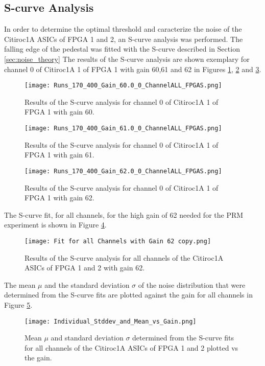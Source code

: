 \subsection{S-curve Analysis}
In order to determine the optimal threshold and caracterize the noise of the Citiroc1A ASICs of FPGA 1 and 2, an S-curve analysis was performed.
\newline
The falling edge of the pedestal was fitted with the S-curve described in Section \ref{sec:noise_theory}
\newline
The results of the S-curve analysis are shown exemplary for channel 0 of Citiroc1A 1 of FPGA 1 with gain 60,61 and 62 in Figures \ref{fig:S_curve_60}, \ref{fig:S_curve_61} and \ref{fig:S_curve_62}.

\begin{figure}[H]
    \centering
    \texttt{[image: Runs\_170\_400\_Gain\_60.0\_0\_ChannelALL\_FPGAS.png]}
    \caption{Results of the S-curve analysis for channel 0 of Citiroc1A 1 of FPGA 1 with gain 60.}
    \label{fig:S_curve_60}
\end{figure}
\begin{figure}[H]
    \centering
    \texttt{[image: Runs\_170\_400\_Gain\_61.0\_0\_ChannelALL\_FPGAS.png]}
    \caption{Results of the S-curve analysis for channel 0 of Citiroc1A 1 of FPGA 1 with gain 61.}
    \label{fig:S_curve_61}
\end{figure}
\begin{figure}[H]
    \centering
    \texttt{[image: Runs\_170\_400\_Gain\_62.0\_0\_ChannelALL\_FPGAS.png]}
    \caption{Results of the S-curve analysis for channel 0 of Citiroc1A 1 of FPGA 1 with gain 62.}
    \label{fig:S_curve_62}
\end{figure}
The S-curve fit, for all channels, for the high gain of 62 needed for the PRM experiment is shown in Figure \ref{fig:S_curve_62_ALL}. 

\begin{figure}[H]
    \centering
    \texttt{[image: Fit for all Channels with Gain 62 copy.png]}
    \caption{Results of the S-curve analysis for all channels of the Citiroc1A ASICs of FPGA 1 and 2 with gain 62.}
    \label{fig:S_curve_62_ALL}
\end{figure}
The mean $\mu$ and the standard deviation $\sigma$ of the noise distribution that were determined from the S-curve fits %
are plotted against the gain for all channels in Figure \ref{fig:Mean vs gain}.
\begin{figure}[H]
    \centering
    \texttt{[image: Individual\_Stddev\_and\_Mean\_vs\_Gain.png]}
    \caption{Mean $\mu$ and standard deviation $\sigma$ determined from the S-curve fits for all channels of the Citiroc1A ASICs of FPGA 1 and 2 plotted vs the gain.}
    \label{fig:Mean vs gain}
\end{figure}

